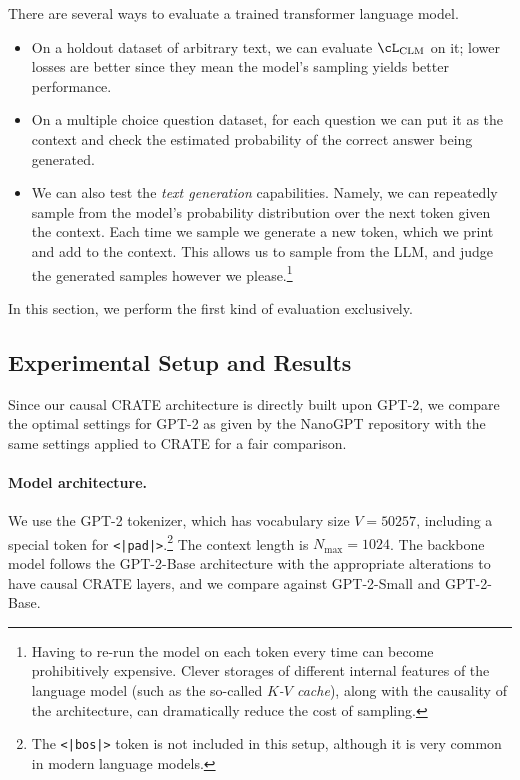 \documentclass[../../book-main.tex]{subfiles}
\begin{document}
There are several ways to evaluate a trained transformer language model.
\begin{itemize}
\item On a holdout dataset of arbitrary text, we can evaluate
\(\cL_{\mathrm{CLM}}\) on it; lower losses are better since they mean
the model's sampling yields better performance.
\item On a multiple choice question dataset, for each question we can
put it as the context and check the estimated probability of the
correct answer being generated.
\item We can also test the \textit{text generation} capabilities.
Namely, we can repeatedly sample from the model's probability
distribution over the next token given the context. Each time we
sample we generate a new token, which we print and add to the
context. This allows us to sample from the LLM, and judge the
generated samples however we please.\footnote{Having to re-run the
    model on each token every time can become prohibitively expensive.
Clever storages of different internal features of the language model
    (such as the so-called \textit{\(K\)-\(V\) cache}), along with the
causality of the architecture, can dramatically reduce the cost of sampling.}
\end{itemize}
In this section, we perform the first kind of evaluation exclusively.

\subsection{Experimental Setup and Results}

Since our causal CRATE architecture is directly built upon GPT-2, we
compare the optimal settings for GPT-2 as given by the NanoGPT
repository \citep{nanogpt} with the same settings applied to CRATE
for a fair comparison.

\paragraph{Model architecture.} We use the GPT-2 tokenizer, which has
vocabulary size \(V = 50257\), including a special token for
\texttt{<|pad|>}.\footnote{The \texttt{<|bos|>} token is not included
in this setup, although it is very common in modern language models.}
The context length is \(N_{\max} = 1024\). The backbone model follows
the GPT-2-Base architecture \citep{radford2019language} with the
appropriate alterations to have causal CRATE layers, and we compare
against GPT-2-Small and GPT-2-Base.
\end{document}
